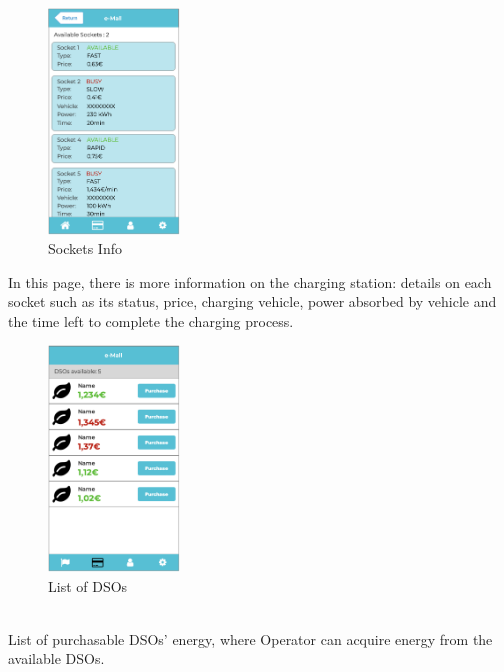 \documentclass[../main.tex]{subfiles}
\begin{document}
\begin{figure}[!htb]
  \centering
  \begin{minipage}[b]{\textwidth}
  \centering
    \includegraphics[width=35mm]{Mockups/mk_op_socketinfo.png}
    \caption{Sockets Info}
    \label{fig:class}
  \end{minipage}
  \hfill
\end{figure}
\noindent
In this page, there is more information on the charging station: details on each socket such as its status, price, charging vehicle, power absorbed by vehicle and the time left to complete the charging process.

  \begin{figure}[!htb]
  \centering
  \begin{minipage}[b]{\textwidth}
  \centering
    \includegraphics[width=35mm]{Mockups/mk_op_dsos.png}
    \caption{List of DSOs}
    \label{fig:class}
  \end{minipage}
\end{figure}\\
List of purchasable DSOs' energy, where Operator can acquire energy from the available DSOs.
\newpage
\end{document}
